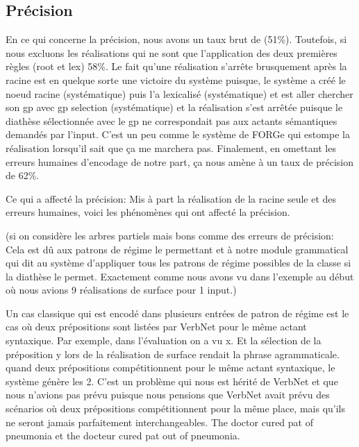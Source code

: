 \subsection{Précision}

En ce qui concerne la précision, nous avons un taux brut de (51\%). Toutefois, si nous excluons les réalisations qui ne sont que l'application des deux premières règles (root et lex) 58\%. Le fait qu'une réalisation s'arrête brusquement après la racine est en quelque sorte une victoire du système puisque, le système a créé le noeud racine (systématique) puis l'a lexicalisé (systématique) et est aller chercher son gp avec gp selection (systématique) et la réalisation s'est arrêtée puisque le diathèse sélectionnée avec le gp ne correspondait pas aux actants sémantiques demandés par l'input. C'est un peu comme le système de FORGe qui estompe la réalisation lorsqu'il sait que ça me marchera pas. Finalement, en omettant les erreurs humaines d'encodage de notre part, ça nous amène à un taux de précision de 62\%.


Ce qui a affecté la précision:
Mis à part la réalisation de la racine seule et des erreurs humaines, voici les phénomènes qui ont affecté la précision.

(si on considère les arbres partiels mais bons comme des erreurs de précision: Cela est dû aux patrons de régime le permettant et à notre module grammatical qui dit au système d'appliquer tous les patrons de régime possibles de la classe si la diathèse le permet. Exactement comme nous avons vu dans l'exemple au début où nous avions 9 réalisations de surface pour 1 input.)

Un cas classique qui est encodé dans plusieurs entrées de patron de régime est le cas où deux prépositions sont listées par VerbNet pour le même actant syntaxique. Par exemple, dans l'évaluation on a vu x. Et la sélection de la préposition y lors de la réalisation de surface rendait la phrase agrammaticale. quand deux prépositions compétitionnent pour le même actant syntaxique, le système génère les 2. C'est un problème qui nous est hérité de VerbNet et que nous n'avions pas prévu puisque nous pensions que VerbNet avait prévu des scénarios où deux prépositions compétitionnent pour la même place, mais qu'ils ne seront jamais parfaitement interchangeables. The doctor cured pat of pneumonia et the docteur cured pat out of pneumonia.

